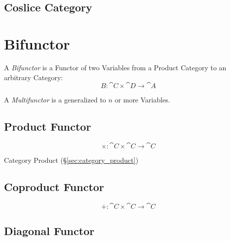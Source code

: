 \subsection{Coslice Category}\label{sec:coslice_category}



\section{Bifunctor}\label{sec:bifunctor}

A \emph{Bifunctor} is a Functor of two Variables from a Product
Category to an arbitrary Category:
\[
  B : \cat{C} \times \cat{D} \rightarrow \cat{A}
\]

A \emph{Multifunctor} is a generalized to $n$ or more Variables.



\subsection{Product Functor}\label{sec:product_functor}

\[
  \times : \cat{C} \times \cat{C} \rightarrow \cat{C}
\]

Category Product (\S\ref{sec:category_product})



\subsection{Coproduct Functor}\label{sec:coproduct_functor}

\[
  + : \cat{C} \times \cat{C} \rightarrow \cat{C}
\]



\subsection{Diagonal Functor}\label{sec:diagonal_functor}

